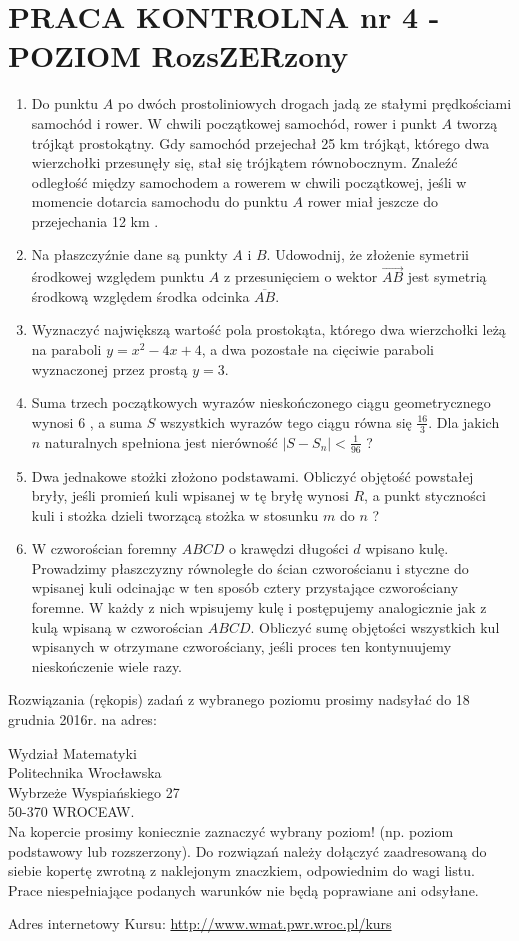 \documentclass[10pt]{article}
\begin{document}
\section*{PRACA KONTROLNA nr 4 - POZIOM RozsZERzony}
\begin{enumerate}
  \item Do punktu $A$ po dwóch prostoliniowych drogach jadą ze stałymi prędkościami samochód i rower. W chwili początkowej samochód, rower i punkt $A$ tworzą trójkąt prostokątny. Gdy samochód przejechał 25 km trójkąt, którego dwa wierzchołki przesunęły się, stał się trójkątem równobocznym. Znaleźć odległość między samochodem a rowerem w chwili początkowej, jeśli w momencie dotarcia samochodu do punktu $A$ rower miał jeszcze do przejechania 12 km .
  \item Na płaszczyźnie dane są punkty $A$ i $B$. Udowodnij, że złożenie symetrii środkowej względem punktu $A$ z przesunięciem o wektor $\overrightarrow{A B}$ jest symetrią środkową względem środka odcinka $\overline{A B}$.
  \item Wyznaczyć największą wartość pola prostokąta, którego dwa wierzchołki leżą na paraboli $y=x^{2}-4 x+4$, a dwa pozostałe na cięciwie paraboli wyznaczonej przez prostą $y=3$.
  \item Suma trzech początkowych wyrazów nieskończonego ciągu geometrycznego wynosi 6 , a suma $S$ wszystkich wyrazów tego ciągu równa się $\frac{16}{3}$. Dla jakich $n$ naturalnych spełniona jest nierówność $\left|S-S_{n}\right|<\frac{1}{96}$ ?
  \item Dwa jednakowe stożki złożono podstawami. Obliczyć objętość powstałej bryły, jeśli promień kuli wpisanej w tę bryłę wynosi $R$, a punkt styczności kuli i stożka dzieli tworzącą stożka w stosunku $m$ do $n$ ?
  \item W czworościan foremny $A B C D$ o krawędzi długości $d$ wpisano kulę. Prowadzimy płaszczyzny równoległe do ścian czworościanu i styczne do wpisanej kuli odcinając w ten sposób cztery przystające czworościany foremne. W każdy z nich wpisujemy kulę i postępujemy analogicznie jak z kulą wpisaną w czworościan $A B C D$. Obliczyć sumę objętości wszystkich kul wpisanych w otrzymane czworościany, jeśli proces ten kontynuujemy nieskończenie wiele razy.
\end{enumerate}

Rozwiązania (rękopis) zadań z wybranego poziomu prosimy nadsyłać do 18 grudnia 2016r. na adres:

Wydział Matematyki\\
Politechnika Wrocławska\\
Wybrzeże Wyspiańskiego 27\\
50-370 WROCEAW.\\
Na kopercie prosimy koniecznie zaznaczyć wybrany poziom! (np. poziom podstawowy lub rozszerzony). Do rozwiązań należy dołączyć zaadresowaną do siebie kopertę zwrotną z naklejonym znaczkiem, odpowiednim do wagi listu. Prace niespełniające podanych warunków nie będą poprawiane ani odsyłane.

Adres internetowy Kursu: \href{http://www.wmat.pwr.wroc.pl/kurs}{http://www.wmat.pwr.wroc.pl/kurs}
\end{document}
